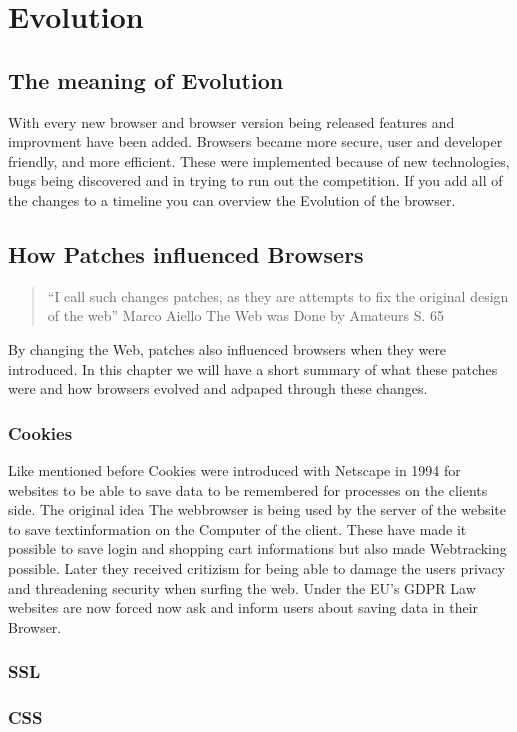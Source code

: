 \documentclass[runningheads]{llncs}
\begin{document}
	\section{Evolution}
		\subsection{The meaning of Evolution}
		With every new browser and browser version being released features and improvment have been added. Browsers became more secure, user and developer friendly, and more efficient. These were implemented because of new technologies, bugs being discovered and in trying to run out the competition. If you add all of the changes to a timeline you can overview the Evolution of the browser.
		\subsection{How Patches influenced Browsers}
			\begin{quote}``I call such changes patches, as they are attempts to fix the original design of the web'' Marco Aiello The Web was Done by Amateurs S. 65 \end{quote}
		By changing the Web, patches also influenced browsers when they were introduced. In this chapter we will have a short summary of what these patches were and how browsers evolved and adpaped through these changes.
			\subsubsection{Cookies}
			Like mentioned before Cookies were introduced with Netscape in 1994 for websites to be able to save data to be remembered for processes on the clients side. The original idea The webbrowser is being used by the server of the website to save textinformation on the Computer of the client. These have made it possible to save login and shopping cart informations but also made Webtracking possible. Later they received critizism for being able to damage the users privacy and threadening security when surfing the web. Under the EU's GDPR Law websites are now forced now ask and inform users about saving data in their Browser.
			\subsubsection{SSL}
			\subsubsection{CSS}
\end{document}
